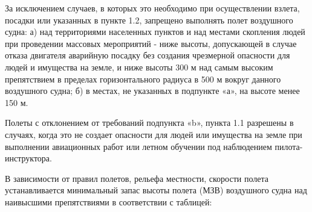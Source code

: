 \begin{appendix}
    
     За исключением случаев, в которых это необходимо при осуществлении взлета, посадки или указанных в пункте 1.2, запрещено выполнять полет воздушного судна: 
    а)  над территориями населенных пунктов и над местами скопления людей при проведении массовых мероприятий - ниже высоты, допускающей в случае отказа двигателя аварийную посадку без создания чрезмерной опасности для людей и имущества на земле, и ниже высоты 300 м над самым высоким препятствием в пределах горизонтального радиуса в 500 м вокруг данного воздушного судна; 
    б)  в местах, не указанных в подпункте «а», на высоте менее 150 м. 
    
     Полеты с отклонением от требований подпункта «b», пункта 1.1 разрешены в случаях, когда это не создает опасности для людей или имущества на земле при выполнении авиационных работ или летном обучении под наблюдением пилота-инструктора. 
    
     В зависимости от правил полетов, рельефа местности, скорости полета устанавливается минимальный запас высоты полета (МЗВ) воздушного судна над наивысшими препятствиями в соответствии с таблицей:
    

\end{appendix}
